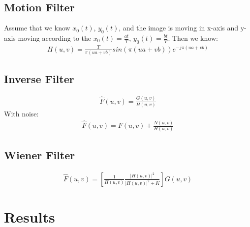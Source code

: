 \documentclass[11pt,oneside]{book}
\begin{document}
\subsection{Motion Filter}
Assume that we know $x_0(t)$, $y_0(t)$, and the image is moving in x-axis and y-axis moving according to the $x_0(t)=\frac{at}{T}$, $y_0(t)=\frac{bt}{T}$. Then we know:
\begin{align}
H(u,v) = \frac{T}{\pi(ua+vb)}sin(\pi(ua+vb))e^{-j\pi(ua+vb)}
\end{align}
\subsection{Inverse Filter}
\begin{align}
\hat{F}(u,v)=\frac{G(u,v)}{H(u,v)}
\end{align}
With noise:
\begin{align}
\hat{F}(u,v)=F(u,v)+\frac{N(u,v)}{H(u,v)}
\end{align}
\subsection{Wiener Filter}
\begin{align}
\hat{F}(u,v)=[\frac{1}{H(u,v)}\frac{|H(u,v)|^2}{|H(u,v)|^2+K}]G(u,v)
\end{align}
\section{Results}
\end{document}
